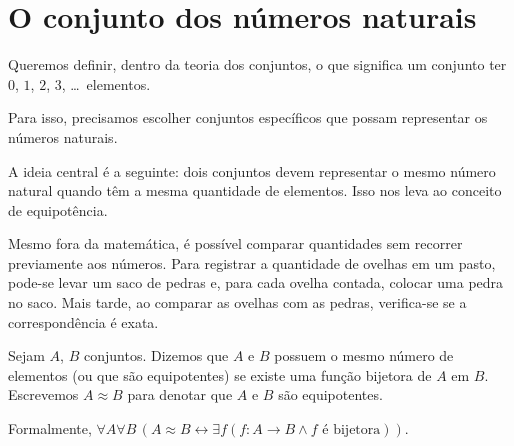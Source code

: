 \section{O conjunto dos números naturais}\label{sec:introducaoAosNaturais}
Queremos definir, dentro da teoria dos conjuntos, o que significa um conjunto ter $0$, $1$, $2$, $3$, \dots\ elementos.

Para isso, precisamos escolher conjuntos específicos que possam representar os números naturais.

A ideia central é a seguinte: dois conjuntos devem representar o mesmo número natural quando têm a mesma quantidade de elementos. Isso nos leva ao conceito de equipotência.

Mesmo fora da matemática, é possível comparar quantidades sem recorrer previamente aos números.
Para registrar a quantidade de ovelhas em um pasto, pode-se levar um saco de pedras e, para cada ovelha contada, colocar uma pedra no saco.
Mais tarde, ao comparar as ovelhas com as pedras, verifica-se se a correspondência é exata.

\begin{definition}[$\BST$]\label{def:equipotencia}
    Sejam $A$, $B$ conjuntos.
    Dizemos que $A$ e $B$ possuem o mesmo número de elementos (ou que são equipotentes) se existe uma função bijetora de $A$ em $B$.
    Escrevemos $A \approx B$ para denotar que $A$ e $B$ são equipotentes.
    
    Formalmente, $\forall A \forall B\, (A \approx B \leftrightarrow \exists f (f:A\to B \land f \text{ é bijetora}))$.
\end{definition}

